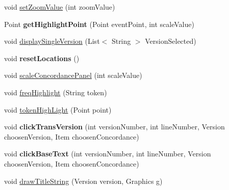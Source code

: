 \begin{DoxyCompactItemize}
void \hyperlink{classtranslation_visualizaton_g_u_i_1_1_concordance_panel_a09b316adf18485d4f1c53e86b46eb780}{set\+Zoom\+Value} (int zoom\+Value)
\item 
\mbox{\label{classtranslation_visualizaton_g_u_i_1_1_concordance_panel_a8c481564463d10e9f5e7df34479febf3}} 
Point {\bfseries get\+Highlight\+Point} (Point event\+Point, int scale\+Value)
\item 
void \hyperlink{classtranslation_visualizaton_g_u_i_1_1_concordance_panel_af3a9707e42d94bea4d7995927bc2bbcb}{display\+Single\+Version} (List$<$ String $>$ Version\+Selected)
\item 
\mbox{\label{classtranslation_visualizaton_g_u_i_1_1_concordance_panel_a8a77a47204bb5df44fccce3bfa1caf80}} 
void {\bfseries reset\+Locations} ()
\item 
void \hyperlink{classtranslation_visualizaton_g_u_i_1_1_concordance_panel_ae6d25eb2cfc8138b251aef627c5b488c}{scale\+Concordance\+Panel} (int scale\+Value)
\item 
void \hyperlink{classtranslation_visualizaton_g_u_i_1_1_concordance_panel_a3594f96dfd91bfcf29ce1290b1aab8a1}{freq\+Highlight} (String token)
\item 
void \hyperlink{classtranslation_visualizaton_g_u_i_1_1_concordance_panel_afded200aebb62892defa82de90b4db47}{token\+High\+Light} (Point point)
\item 
\mbox{\label{classtranslation_visualizaton_g_u_i_1_1_concordance_panel_a80f5b7ec9dde95c9e8adeca0884af361}} 
void {\bfseries click\+Trans\+Version} (int version\+Number, int line\+Number, Version choosen\+Version, Item choosen\+Concordance)
\item 
\mbox{\label{classtranslation_visualizaton_g_u_i_1_1_concordance_panel_a0818bca964b781800b90c5b422d39f1b}} 
void {\bfseries click\+Base\+Text} (int version\+Number, int line\+Number, Version choosen\+Version, Item choosen\+Concordance)
\item 
void \hyperlink{classtranslation_visualizaton_g_u_i_1_1_concordance_panel_a6cf64e1636b26682080e80a25b714e78}{draw\+Title\+String} (Version version, Graphics g)
\item 

\end{DoxyCompactItemize}
